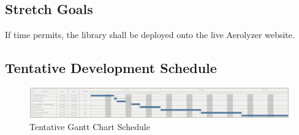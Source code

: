 \documentclass[journal,10pt,draftclsnofoot,onecolumn]{IEEEtran}
\begin{document}
\begin{singlespace}
	\subsection{Stretch Goals}
		If time permits, the library shall be deployed onto the live Aerolyzer website.

	\begin{landscape}
		\subsection{Tentative Development Schedule}
		\begin{figure}[h]
			\includegraphics[width=9.5in]{gantt.png}
			\caption{Tentative Gantt Chart Schedule}
		    \label{fig:Tentative Schedule}
	    \end{figure}
	\end{landscape}

\end{singlespace}
\end{document}
